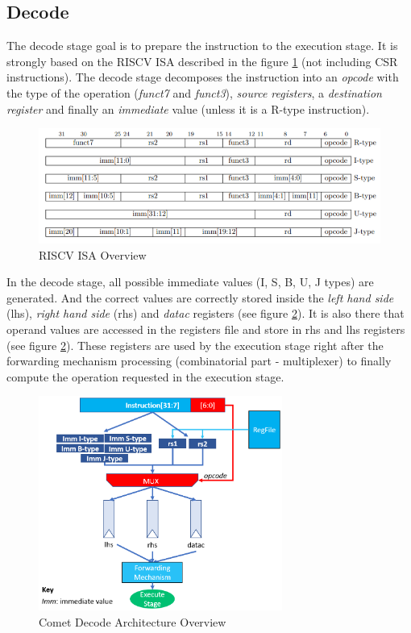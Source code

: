 \documentclass[10pt,letterpaper]{article}
\begin{document}
\subsection{Decode}

The decode stage goal is to prepare the instruction to the execution stage. It is strongly based on the RISCV ISA described in the figure \ref{fig:isa} (not including CSR instructions). The decode stage decomposes the instruction into an \textit{opcode} with the type of the operation (\textit{funct7} and \textit{funct3}), \textit{source registers}, a \textit{destination register} and finally an \textit{immediate} value (unless it is a R-type instruction).

\begin{figure}[H]
\centering
\includegraphics[width=12cm]{img/riscv-isa.PNG}
\caption{RISCV ISA Overview}
\label{fig:isa}
\end{figure}

In the decode stage, all possible immediate values (I, S, B, U, J types) are generated. And the correct values are correctly stored inside the \textit{left hand side} (lhs), \textit{right hand side} (rhs) and \textit{datac} registers (see figure \ref{fig:decode}). It is also there that operand values are accessed in the registers file and store in rhs and lhs registers (see figure \ref{fig:decode}). These registers are used by the execution stage right after the forwarding mechanism processing (combinatorial part - multiplexer) to finally compute the operation requested in the execution stage.

\begin{figure}[H]
\centering
\includegraphics[width=8cm]{img/macro_decode.PNG}
\caption{Comet Decode Architecture Overview}
\label{fig:decode}
\end{figure}
\end{document}
